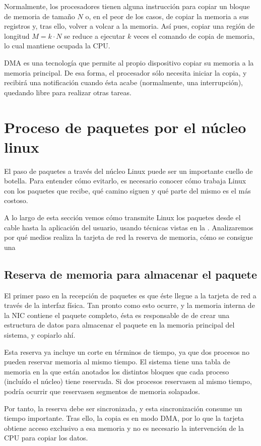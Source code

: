 Normalmente, los procesadores tienen alguna instrucción para copiar un bloque de memoria de tamaño $N$ o, en el peor de 
los casos, de copiar la memoria a sus registros y, tras ello, volver a volcar a la memoria. Así pues, copiar una región 
de longitud $M=k\cdot N$ se reduce a ejecutar $k$ veces el comando de copia de memoria, lo cual mantiene ocupada la CPU.

\gls{DMA} es una tecnología que permite al propio dispositivo copiar su memoria a la memoria principal. De esa forma, 
el procesador sólo necesita iniciar la copia, y recibirá una notificación cuando ésta acabe (normalmente, una 
interrupción), quedando libre para realizar otras tareas.


\section{Proceso de paquetes por el núcleo linux}
El paso de paquetes a través del núcleo Linux puede ser un importante cuello de botella. Para entender cómo evitarlo, 
es necesario conocer cómo trabaja Linux con los paquetes que recibe, qué camino siguen y qué parte del mismo es el más 
costoso.

A lo largo de esta sección vemos cómo transmite Linux los paquetes desde el cable hasta la aplicación del usuario, 
usando técnicas vistas en la . Analizaremos por qué medios realiza la tarjeta de red 
la reserva de memoria, cómo se consigue una 

\subsection{Reserva de memoria para almacenar el paquete}
El primer paso en la recepción de paquetes es que éste llegue a la tarjeta de red a través de la interfaz física. Tan 
pronto como esto ocurre, y la memoria interna de la \gls{NIC} contiene el paquete completo, ésta es responsable de 
de crear una estructura de datos para almacenar el paquete en la memoria principal del sistema, y copiarlo ahí.

Esta reserva ya incluye un corte en términos de tiempo, ya que dos procesos no pueden reservar memoria al mismo tiempo. 
El sistema tiene una tabla de memoria en la que están anotados los distintos bloques que cada proceso (incluído el 
núcleo) tiene reservada. Si dos procesos reservasen al mismo tiempo, podría ocurrir que reservasen segmentos de memoria 
solapados.

Por tanto, la reserva debe ser sincronizada, y esta sincronización consume un tiempo importante. Tras ello, la copia es 
en modo \gls{DMA}, por lo que la tarjeta obtiene acceso exclusivo a esa memoria y no es necesario la intervención de la 
CPU para copiar los datos.

